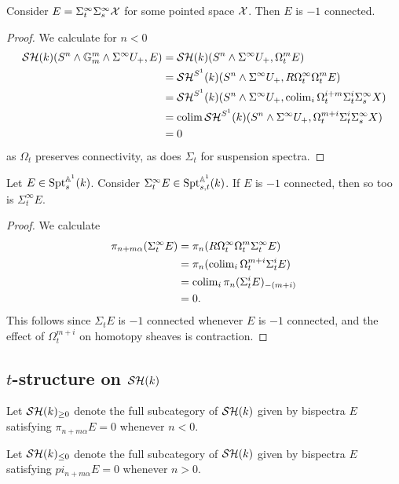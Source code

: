 \documentclass{amsart}%
\begin{document}
\begin{lemma}
  Consider $ E =\Sigma_t^{\infty}\Sigma_s^{\infty} \mathcal{X}$ for some pointed
  space $\mathcal{X}$. Then $E$ is $-1$ connected. 
\end{lemma}

\begin{proof}
  We calculate for $n<0$
  \begin{align*}
    \mathcal{SH}(k)(S^n\wedge\mathbb{G}_m^m \wedge \Sigma^{\infty}U_+, E) & = \mathcal{SH}(k)(S^n\wedge \Sigma^{\infty}U_+, \Omega_t^{m}E)\\
    & =\mathcal{SH}^{S^1}(k)(S^n \wedge \Sigma^{\infty}U_+, R\Omega^{\infty}_t\Omega_t^{m}E) \\
    & = \mathcal{SH}^{S^1}(k)(S^n \wedge \Sigma^{\infty}U_+, \operatorname{colim}_i \Omega_t^{i+m}\Sigma_t^i \Sigma_s^{\infty} X)\\
    & = \operatorname{colim} \mathcal{SH}^{S^1}(k)(S^n \wedge \Sigma^{\infty}U_+, \Omega_t^{m+i}\Sigma_t^i \Sigma_s^{\infty} X)\\
      & = 0
  \end{align*}
  as $\Omega_t$ preserves connectivity, as does $\Sigma_t$ for
  suspension spectra.
\end{proof}

\begin{proposition}
  Let $E \in \mathrm{Spt}_s^{\mathbb{A}^1}(k)$. Consider
  $\Sigma^{\infty}_t E \in \mathrm{Spt}_{s,t}^{\mathbb{A}^1}(k)$. If $E$ is $-1$ connected,
  then so too is $\Sigma^{\infty}_t E$. 
\end{proposition}

\begin{proof}
We calculate
\begin{align*}
  \pi_{n+m\alpha}(\Sigma^{\infty}_t E) 
  & = \pi_n(R\Omega^{\infty}_t\Omega_t^m \Sigma^{\infty}_t E) \\ 
  & = \pi_n (\operatorname{colim}_i \Omega_t^{m+i}\Sigma_t^{i} E) \\
  & = \operatorname{colim}_i \pi_n (\Sigma_t^{i}E)_{-(m+i)}\\
  & = 0.
\end{align*}
This follows since $\Sigma_tE$ is $-1$ connected whenever $E$ is $-1$
connected, and the effect of $\Omega_t^{m+i}$ on homotopy sheaves is
contraction. 
\end{proof}

\subsection{$t$-structure on $\mathcal{SH}(k)$}

\begin{definition}
  Let $\mathcal{SH}(k)_{\geq 0}$ denote the full subcategory of $\mathcal{SH}(k)$ given
  by bispectra $E$ satisfying $\pi_{n+m\alpha}E = 0 $ whenever
  $n < 0$.

  Let $\mathcal{SH}(k)_{\leq 0}$ denote the full subcategory of $\mathcal{SH}(k)$ given
  by bispectra $E$ satisfying $pi_{n+m\alpha}E = 0$ whenever $n >0$. 
\end{definition}
\end{document}
